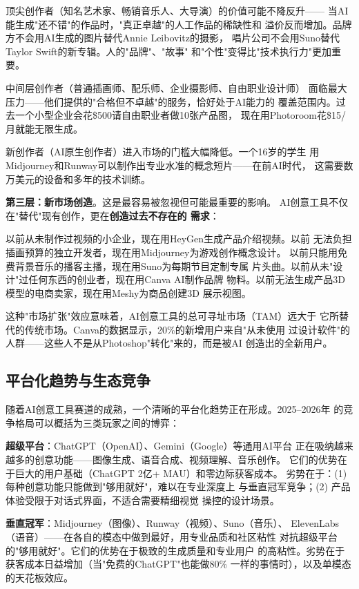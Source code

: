 顶尖创作者（知名艺术家、畅销音乐人、大导演）的价值可能不降反升——
当AI能生成"还不错"的作品时，"真正卓越"的人工作品的稀缺性和
溢价反而增加。品牌方不会用AI生成的图片替代Annie Leibovitz的摄影，
唱片公司不会用Suno替代Taylor Swift的新专辑。人的"品牌"、"故事"
和"个性"变得比"技术执行力"更加重要。

中间层创作者（普通插画师、配乐师、企业摄影师、自由职业设计师）
面临最大压力——他们提供的"合格但不卓越"的服务，恰好处于AI能力的
覆盖范围内。过去一个小型企业会花\$500请自由职业者做10张产品图，
现在用Photoroom花\$15/月就能无限生成。

新创作者（AI原生创作者）进入市场的门槛大幅降低。一个16岁的学生
用Midjourney和Runway可以制作出专业水准的概念短片——在前AI时代，
这需要数万美元的设备和多年的技术训练。

\textbf{第三层：新市场创造}。这是最容易被忽视但可能最重要的影响。
AI创意工具不仅在"替代"现有创作，更在\textbf{创造过去不存在的
需求}：

以前从未制作过视频的小企业，现在用HeyGen生成产品介绍视频。以前
无法负担插画预算的独立开发者，现在用Midjourney为游戏创作概念设计。
以前只能用免费背景音乐的播客主播，现在用Suno为每期节目定制专属
片头曲。以前从未"设计"过任何东西的创业者，现在用Canva AI制作品牌
物料。以前无法生成产品3D模型的电商卖家，现在用Meshy为商品创建3D
展示视图。

这种"市场扩张"效应意味着，AI创意工具的总可寻址市场（TAM）远大于
它所替代的传统市场。Canva的数据显示，20\%的新增用户来自"从未使用
过设计软件"的人群——这些人不是从Photoshop"转化"来的，而是被AI
创造出的全新用户。

\subsection{平台化趋势与生态竞争}
\label{subsec:create-platform}

随着AI创意工具赛道的成熟，一个清晰的平台化趋势正在形成。2025--2026年
的竞争格局可以概括为三类玩家之间的博弈：

\textbf{超级平台}：ChatGPT（OpenAI）、Gemini（Google）等通用AI平台
正在吸纳越来越多的创意功能——图像生成、语音合成、视频理解、音乐创作。
它们的优势在于巨大的用户基础（ChatGPT 2亿+ MAU）和零边际获客成本。
劣势在于：(1) 每种创意功能只能做到"够用就好"，难以在专业深度上
与垂直冠军竞争；(2) 产品体验受限于对话式界面，不适合需要精细视觉
操控的设计场景。

\textbf{垂直冠军}：Midjourney（图像）、Runway（视频）、Suno（音乐）、
ElevenLabs（语音）——在各自的模态中做到最好，用专业品质和社区粘性
对抗超级平台的"够用就好"。它们的优势在于极致的生成质量和专业用户
的高粘性。劣势在于获客成本日益增加（当"免费的ChatGPT"也能做80\%
一样的事情时），以及单模态的天花板效应。

